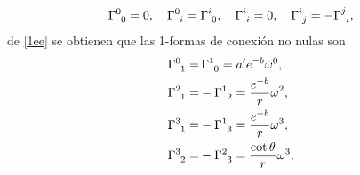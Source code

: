 \begin{equation*}
    \tensor{\Gamma}{^0_0}=0,\quad \tensor{\Gamma}{^0_i} = \tensor{\Gamma}{^i_0}, \quad \tensor{\Gamma}{^i_i} = 0, \quad \tensor{\Gamma}{^i_j} = -\tensor{\Gamma}{^j_i},
\end{equation*}
de \eqref{1ee} se obtienen que las 1-formas de conexión no nulas son
\begin{subequations}
    \begin{align}
        \tensor{\Gamma}{^0_1} =& \,\tensor{\Gamma}{^1_0} = a^{\prime} e^{-b} \omega^0, \label{1fa} \\
        \tensor{\Gamma}{^2_1} =& -\tensor{\Gamma}{^1_2} = \frac{e^{-b}}{r}\omega^2, \label{1fb} \\
        \tensor{\Gamma}{^3_1} =& -\tensor{\Gamma}{^1_3} = \frac{e^{-b}}{r}\omega^3, \label{1fc} \\
        \tensor{\Gamma}{^3_2} =& -\tensor{\Gamma}{^2_3} = \frac{\cot{\theta}}{r} \omega^3. \label{1fd}
    \end{align}
\end{subequations}


